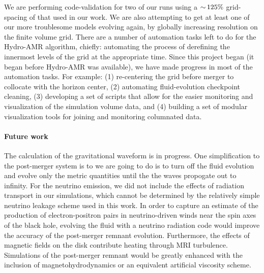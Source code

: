 We are performing code-validation for two of our runs using a $\mathord{\sim}\,125\%$ grid-spacing of that used in our work.
We are also attempting to get at least one of our more troublesome models evolving again, by globally increasing resolution on the finite volume grid.
There are a number of automation tasks left to do for the Hydro-AMR algorithm, chiefly: automating the process of derefining the innermost levels of the grid at the appropriate time.
Since this project began (it began before Hydro-AMR was available), we have made progress in most of the automation tasks. For example:
(1) re-centering the grid before merger to collocate with the horizon center, 
(2) automating fluid-evolution checkpoint cleaning, 
(3) developing a set of scripts that allow for the easier monitoring and visualization of the simulation volume data, 
and (4) building a set of modular visualization tools for joining and monitoring columnated data.

\paragraph{Future work} 

The calculation of the gravitational waveform is in progress.
One simplification to the post-merger system is to  we are going to do is to turn off the fluid evolution and evolve only the metric quantities until the the waves propogate out to infinity.
For the neutrino emission, we did not include the effects of radiation transport in our simulations, which cannot be determined by the relatively simple neutrino leakage scheme used in this work.
In order to capture an estimate of the production of electron-positron pairs in neutrino-driven winds near the spin axes of the black hole, evolving the fluid with a neutrino radiation code would improve the accuracy of the post-merger remnant evolution.
Furthermore, the effects of magnetic fields on the disk contribute heating through MRI turbulence.
Simulations of the post-merger remnant would be greatly enhanced with the inclusion of magnetohydrodynamics or an equivalent artificial viscosity scheme. 


